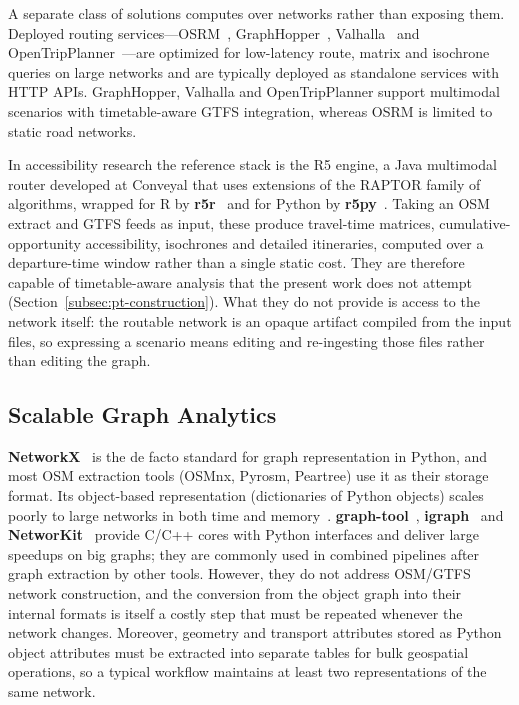 \documentclass[smartcities,article,submit,moreauthors]{Definitions/mdpi}
\begin{document}
    A separate class of solutions computes over networks rather than exposing them.
    Deployed routing services---OSRM~\cite{osrm}, GraphHopper~\cite{graphhopper},
    Valhalla~\cite{valhalla} and OpenTripPlanner~\cite{otp}---are optimized for low-latency route,
    matrix and isochrone queries on large networks and are typically deployed as standalone services
    with HTTP APIs.
    GraphHopper, Valhalla and OpenTripPlanner support multimodal scenarios with timetable-aware GTFS
    integration, whereas OSRM is limited to static road networks.

    In accessibility research the reference stack is the R5 engine, a Java multimodal router developed
    at Conveyal that uses extensions of the RAPTOR family of algorithms, wrapped for R by
    \textbf{r5r}~\cite{pereira2021r5r} and for Python by \textbf{r5py}~\cite{fink2022r5py}.
    Taking an OSM extract and GTFS feeds as input, these produce travel-time matrices,
    cumulative-opportunity accessibility, isochrones and detailed itineraries, computed over a
    departure-time window rather than a single static cost.
    They are therefore capable of timetable-aware analysis that the present work does not attempt
    (Section~\ref{subsec:pt-construction}).
    What they do not provide is access to the network itself: the routable network is an opaque
    artifact compiled from the input files, so expressing a scenario means editing and re-ingesting
    those files rather than editing the graph.

    \subsection{Scalable Graph Analytics}
    \label{subsec:rw-graph-libs}

    \textbf{NetworkX}~\cite{hagberg2008networkx} is the de facto standard for graph representation in
    Python, and most OSM extraction tools (OSMnx, Pyrosm, Peartree) use it as their storage format.
    Its object-based representation (dictionaries of Python objects) scales poorly to large networks in
    both time and memory~\cite{staudt2016networkit,benchmark_graphtools}.
    \textbf{graph-tool}~\cite{graphtool_docs}, \textbf{igraph}~\cite{csardi2006igraph} and
    \textbf{NetworKit}~\cite{staudt2016networkit} provide C/C++ cores with Python interfaces and deliver
    large speedups on big graphs; they are commonly used in combined pipelines after graph extraction by
    other tools.
    However, they do not address OSM/GTFS network construction, and the conversion from the object graph
    into their internal formats is itself a costly step that must be repeated whenever the network
    changes.
    Moreover, geometry and transport attributes stored as Python object attributes must be extracted
    into separate tables for bulk geospatial operations, so a typical workflow maintains at least two
    representations of the same network.
\end{document}
